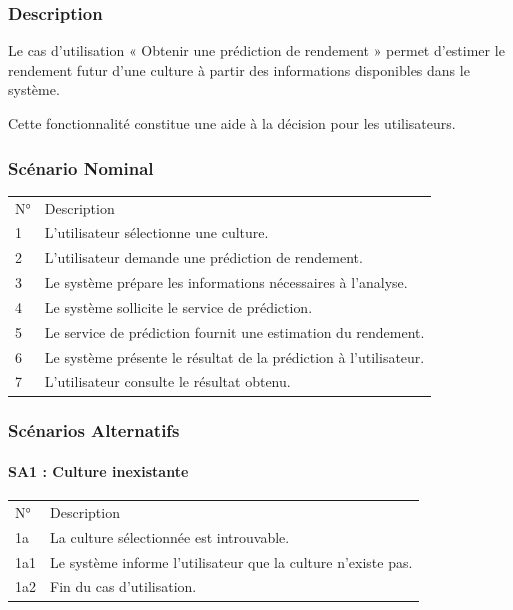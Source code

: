 \documentclass[
]{article}
\begin{document}
\hypertarget{description-2}{%
\subsubsection{Description}\label{description-2}}

Le cas d'utilisation « Obtenir une prédiction de rendement » permet
d'estimer le rendement futur d'une culture à partir des informations
disponibles dans le système.

Cette fonctionnalité constitue une aide à la décision pour les
utilisateurs.

\hypertarget{scuxe9nario-nominal-3}{%
\subsubsection{Scénario Nominal}\label{scuxe9nario-nominal-3}}

\begin{longtable}[]{@{}ll@{}}
\toprule
\endhead
N° & Description \\
1 & L'utilisateur sélectionne une culture. \\
2 & L'utilisateur demande une prédiction de rendement. \\
3 & Le système prépare les informations nécessaires à l'analyse. \\
4 & Le système sollicite le service de prédiction. \\
5 & Le service de prédiction fournit une estimation du rendement. \\
6 & Le système présente le résultat de la prédiction à l'utilisateur. \\
7 & L'utilisateur consulte le résultat obtenu. \\
\bottomrule
\end{longtable}

\hypertarget{scuxe9narios-alternatifs-3}{%
\subsubsection{Scénarios Alternatifs}\label{scuxe9narios-alternatifs-3}}

\hypertarget{sa1-culture-inexistante-1}{%
\paragraph{SA1 : Culture inexistante}\label{sa1-culture-inexistante-1}}

\begin{longtable}[]{@{}ll@{}}
\toprule
\endhead
N° & Description \\
1a & La culture sélectionnée est introuvable. \\
1a1 & Le système informe l'utilisateur que la culture n'existe pas. \\
1a2 & Fin du cas d'utilisation. \\
\bottomrule
\end{longtable}
\end{document}
